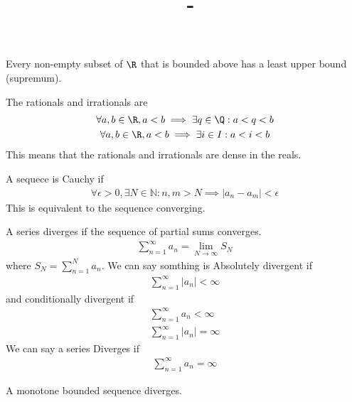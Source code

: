 \documentclass[answers,12pt,addpoints]{exam}
\author{\name}
\title{\course \ - \assignment}
\begin{document}
\maketitle
\begin{definition}
    Every non-empty subset of $\R$ that is bounded above has a least upper bound (supremum).
\end{definition}
\begin{definition}
    The rationals and irrationals are
    \begin{gather*}
        \forall a,b \in \R, a < b \implies \exists q \in \Q : a < q < b\\
        \forall a,b \in \R, a < b \implies \exists i \in I : a < i < b
    \end{gather*}
    This means that the rationals and irrationals are dense in the reals.
\end{definition}
\begin{definition}[Cauchy]
    A sequece is Cauchy if
    \begin{gather*}
        \forall \epsilon > 0, \exists N \in \mathbb{N} : n,m > N \implies |a_n - a_m| < \epsilon
    \end{gather*}
    This is equivalent to the sequence converging.
\end{definition}
\begin{definition}
    A series diverges if the sequence of partial sums converges.
    \begin{gather*}
        \sum_{n=1}^{\infty} a_n = \lim_{N \to \infty} S_N
    \end{gather*}
    where $S_N = \sum_{n=1}^{N} a_n$.
    We can say somthing is Absolutely divergent if
    \begin{gather*}
        \sum_{n=1}^{\infty} |a_n| < \infty
    \end{gather*}
    and conditionally divergent if
    \begin{gather*}
        \sum_{n=1}^{\infty} a_n < \infty\\
        \sum_{n=1}^{\infty} |a_n| = \infty
    \end{gather*}
    We can say a series Diverges if
    \begin{gather*}
        \sum_{n=1}^{\infty} a_n = \infty
    \end{gather*}
\end{definition}
\begin{definition}
    A monotone bounded sequence diverges.
\end{definition}
\end{document}
